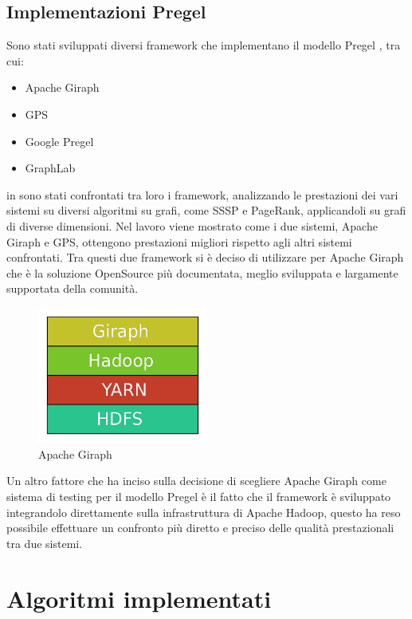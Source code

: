 \documentclass[LaM,binding=0.6cm]{sapthesis}
\begin{document}
\section{Implementazioni Pregel}
Sono stati sviluppati diversi framework che implementano il modello Pregel \cite{Karloff:2010:MCM:1873601.1873677}, tra cui:
\begin{itemize}
\item Apache Giraph \cite{4_giraph.apache.org_2015}
\item GPS\cite{5_infolab.stanford.edu_2015}
\item Google Pregel \cite{Malewicz:2010:PSL:1807167.1807184}
\item GraphLab \cite{6_dato_2015}
\end{itemize}

in \cite{Han:2014:ECP:2732977.2732980} sono stati confrontati tra loro i framework, analizzando le prestazioni dei vari sistemi su diversi algoritmi su grafi, come SSSP e PageRank, applicandoli su grafi di diverse dimensioni.
Nel lavoro viene mostrato come i due sistemi, Apache Giraph e GPS, ottengono prestazioni migliori rispetto agli altri sistemi confrontati. Tra questi due framework si è deciso di utilizzare per Apache Giraph che è la soluzione OpenSource più documentata, meglio sviluppata e largamente supportata della comunità.


\begin{figure}
\centering
\includegraphics[width=0.5\textwidth]{layer_giraph}
\caption{Apache Giraph}
\label{fig:giraph}
\end{figure}

Un altro fattore  che ha inciso sulla decisione di scegliere Apache Giraph come sistema di testing per il modello Pregel è il fatto che il framework è sviluppato integrandolo direttamente sulla infrastruttura di Apache Hadoop, questo ha reso possibile effettuare un confronto più diretto e preciso delle qualità prestazionali tra due sistemi.

\chapter{Algoritmi implementati}
\end{document}
